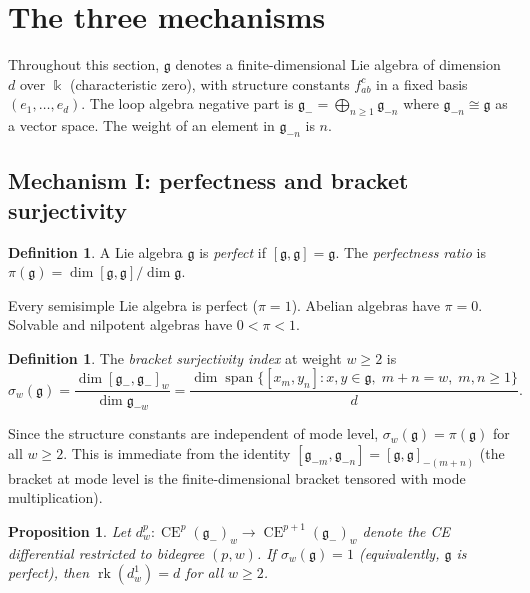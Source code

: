 \documentclass[11pt,reqno]{amsart}
\theoremstyle{plain}
\newtheorem{proposition}[theorem]{Proposition}
\theoremstyle{definition}
\newtheorem{definition}[theorem]{Definition}
\theoremstyle{remark}
\DeclareMathOperator{\CE}{CE}
\DeclareMathOperator{\rk}{rk}
\newcommand{\fg}{\mathfrak{g}}
\newcommand{\gminus}{\fg_{-}}
\newcommand{\kk}{\Bbbk}
\begin{document}
\section{The three mechanisms}
\label{sec:mechanisms}

Throughout this section, $\fg$ denotes a finite-dimensional Lie algebra of
dimension $d$ over $\kk$ (characteristic zero), with structure constants
$f^c_{ab}$ in a fixed basis $(e_1, \ldots, e_d)$. The loop algebra negative
part is $\gminus = \bigoplus_{n \ge 1} \fg_{-n}$ where $\fg_{-n} \cong \fg$
as a vector space. The weight of an element in $\fg_{-n}$ is $n$.

\subsection{Mechanism I: perfectness and bracket surjectivity}
\label{sec:perfectness}

\begin{definition}\label{def:perfectness}
 A Lie algebra $\fg$ is \emph{perfect} if $[\fg, \fg] = \fg$. The
 \emph{perfectness ratio} is $\pi(\fg) = \dim[\fg,\fg] / \dim \fg$.
\end{definition}

Every semisimple Lie algebra is perfect ($\pi = 1$). Abelian algebras
have $\pi = 0$. Solvable and nilpotent algebras have $0 < \pi < 1$.

\begin{definition}\label{def:surj-index}
 The \emph{bracket surjectivity index} at weight $w \ge 2$ is
 \[
 \sigma_w(\fg) = \frac{\dim[\gminus, \gminus]_w}{\dim \fg_{-w}} =
 \frac{\dim \operatorname{span}\{ [x_m, y_n] : x,y \in \fg, \; m + n = w, \;
 m, n \ge 1 \}}{d}.
 \]
\end{definition}

Since the structure constants are independent of mode level, $\sigma_w(\fg) =
\pi(\fg)$ for all $w \ge 2$. This is immediate from the identity $[\fg_{-m},
\fg_{-n}] = [\fg, \fg]_{-(m+n)}$ (the bracket at mode level is the
finite-dimensional bracket tensored with mode multiplication).

\begin{proposition}\label{prop:bracket-CE}
 Let $d^p_w \colon \CE^p(\gminus)_w \to \CE^{p+1}(\gminus)_w$ denote the CE
 differential restricted to bidegree $(p, w)$. If $\sigma_w(\fg) = 1$
 (equivalently, $\fg$ is perfect), then $\rk(d^1_w) = d$ for all $w \ge 2$.
\end{proposition}
\end{document}
